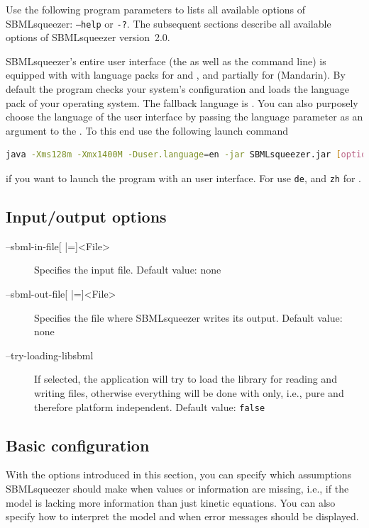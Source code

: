 Use the following program parameters to lists all available options of
SBMLsqueezer: \texttt{--help} or \texttt{-?}.
The subsequent sections describe all available options of SBMLsqueezer
version~2.0.

SBMLsqueezer's entire user interface (the \GUI as well as the command line) is equipped
with with language packs for \German and \English, and partially for \Chinese (Mandarin).
By default the program checks your system's configuration and loads the language pack of
your operating system.
The fallback language is \English.
You can also purposely choose the language of the user interface by passing the language parameter as an
argument to the \JVM.
To this end use the following launch command
\begin{lstlisting}[language=bash, numbers=none, caption={Launching SBMLsqueezer with an alternative language pack}]
java -Xms128m -Xmx1400M -Duser.language=en -jar SBMLsqueezer.jar [options]
\end{lstlisting}
if you want to launch the program with an \English user interface.
For \German use \texttt{de}, and \texttt{zh} for \Chinese.

\subsection{Input/output options}
\label{sec:IO_options}
\begin{description}
\item[--sbml-in-file{[} |={]}<File>]
  Specifies the \SBML input file.
  Default value: none

\item[--sbml-out-file{[} |={]}<File>]
  Specifies the file where SBMLsqueezer writes its \SBML output.
  Default value: none

\item[--try-loading-libsbml]
  If selected, the application will try to load the library \libSBML
  for reading and writing \SBML files, otherwise everything will
  be done with \JSBML only, i.e., pure \Java and therefore platform independent.
  Default value: \texttt{false}
\end{description}

\subsection{Basic configuration}
\label{sec:Basic_configuration}
With the options introduced in this section, you can specify which assumptions
SBMLsqueezer should make when values or information are missing, i.e., if the 
model is lacking more information than just kinetic equations. You can also
specify how to interpret the model and when error messages should be displayed.

